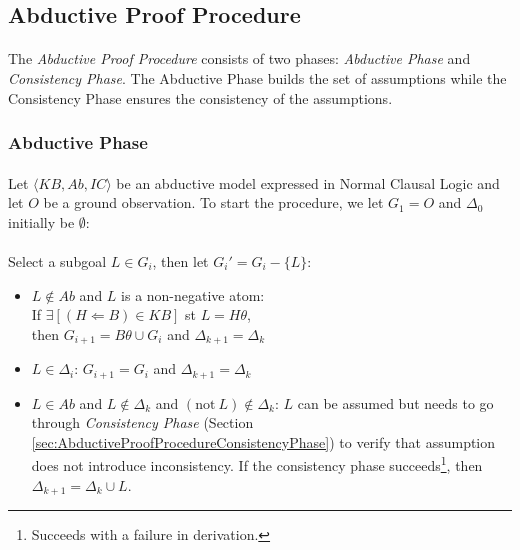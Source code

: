 \documentclass{article}
\theoremstyle{plain}
\theoremstyle{definition}
\begin{document}
\begin{multicols}{2}
\subsection{Abductive Proof Procedure}

\paragraph{} The \textit{Abductive Proof Procedure} consists of two phases: \textit{Abductive Phase} and \textit{Consistency Phase}. The Abductive Phase builds the set of assumptions while the Consistency Phase ensures the consistency of the assumptions.

\subsubsection{Abductive Phase}\label{sec:AbductiveProofProcedureAbductivePhase}

\paragraph{} Let $\langle KB, Ab, IC \rangle$ be an abductive model expressed in Normal Clausal Logic and let $O$ be a ground observation. To start the procedure, we let $G_1 = O$ and $\Delta_0$ initially be $\emptyset$:

\paragraph{} Select a subgoal $L \in G_i$, then let $G_i' = G_i - \{L\}$:
\begin{itemize}
\item $L \not\in Ab$ and $L$ is a non-negative atom:\\ If $\exists [(H \Leftarrow B) \in KB]$ st $L = H\theta$,\\ then $G_{i+1} = B\theta \cup G_i$ and $\Delta_{k+1} = \Delta_k$
\item $L \in \Delta_i$: $G_{i+1} = G_i$ and $\Delta_{k+1} = \Delta_k$
\item $L \in Ab$ and $L \not\in \Delta_k$ and $(\text{not}\ L) \not\in \Delta_k$: $L$ can be assumed but needs to go through \textit{Consistency Phase} (Section \ref{sec:AbductiveProofProcedureConsistencyPhase}) to verify that assumption does not introduce inconsistency. If the consistency phase succeeds\footnote{Succeeds with a failure in derivation.}, then $\Delta_{k+1} = \Delta_k \cup {L}$.
\end{itemize}


\end{multicols}
\end{document}

